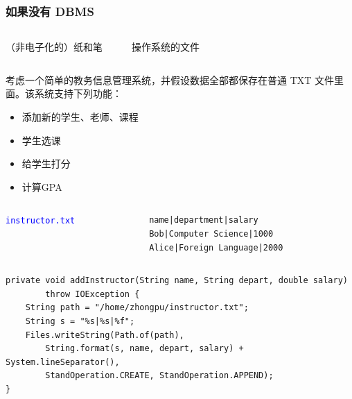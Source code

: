 \documentclass[aspectratio=169, 14pt]{beamer}
\begin{document}
\begin{frame}
    \frametitle{如果没有 DBMS}

    \begin{columns}
        {\Large {}}  {\huge {}}

        （非电子化的）纸和笔

        {\LARGE {}      } 

        操作系统的文件
    \end{columns}
\end{frame}
\begin{frame}
    考虑一个简单的\alert{教务信息管理系统}，并假设数据全部都保存在普通 TXT 文件里面。该系统支持下列功能：
\begin{itemize}
    \item 添加新的学生、老师、课程
    \item 学生选课
    \item 给学生打分
    \item 计算GPA
\end{itemize}
\end{frame}

\begin{frame}[fragile]

    \begin{columns}
        {\large \textcolor{blue}{\texttt{instructor.txt}}}
        \begin{verbatim}
            name|department|salary
            Bob|Computer Science|1000
            Alice|Foreign Language|2000        
         \end{verbatim}
    \end{columns}
\pause
    \begin{verbatim}
private void addInstructor(String name, String depart, double salary)    
        throw IOException {
    String path = "/home/zhongpu/instructor.txt";
    String s = "%s|%s|%f";
    Files.writeString(Path.of(path),
        String.format(s, name, depart, salary) + System.lineSeparator(),
        StandOperation.CREATE, StandOperation.APPEND); 
}
    \end{verbatim}
  
\end{frame}
\end{document}

